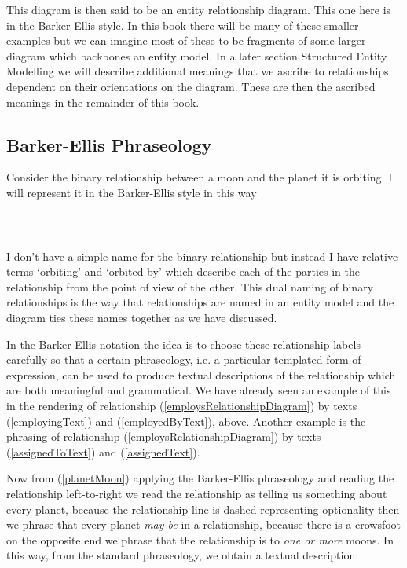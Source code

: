This diagram is then said to be an entity relationship diagram. This one here is in the Barker Ellis style. In this book there will be many of these smaller examples but we can imagine most of these to be fragments of some larger diagram which backbones an entity model.
In a later section Structured Entity Modelling we will describe additional meanings that we ascribe to relationships dependent on their orientations on the diagram. These are then the ascribed meanings in the remainder of this book. 

\subsection*{Barker-Ellis Phraseology} 
\mynote 
Consider the binary relationship between a moon and the planet it is orbiting. 
I will represent it in the  Barker-Ellis style in this way
\begin{gather}
\label{planetMoon}
\raisebox{-0.65cm}{

}
\end{gather}

I don't have a simple name for the binary relationship but instead I have  relative terms `orbiting' and `orbited by' which describe each of the parties in the relationship from the point of view of the other. This dual naming of binary relationships is the way that relationships are named in an entity model and the diagram ties these names together as we have discussed.

\mynote
In the Barker-Ellis notation the idea is to choose these relationship labels
carefully so that a certain phraseology, i.e. a particular templated form of expression,
can be used to produce textual descriptions of the relationship which are both meaningful and grammatical.
We have already seen an example of this in the rendering of
relationship (\ref{employsRelationshipDiagram}) by texts 
(\ref{employingText}) and (\ref{employedByText}), above. 
Another example is the phrasing of relationship (\ref{employsRelationshipDiagram})
by texts (\ref{assignedToText}) and (\ref{assignedText}).  

Now from (\ref{planetMoon}) applying the Barker-Ellis  phraseology and reading the 
relationship left-to-right we read the relationship as telling us something about every planet, because the relationship line is dashed representing optionality then we phrase that every planet \textit{may be} 
in a relationship,
because there is a crowsfoot on the opposite end we phrase that the relationship is to 
\textit{one or more} moons.  In this way, from the standard phraseology, we obtain a textual description:

